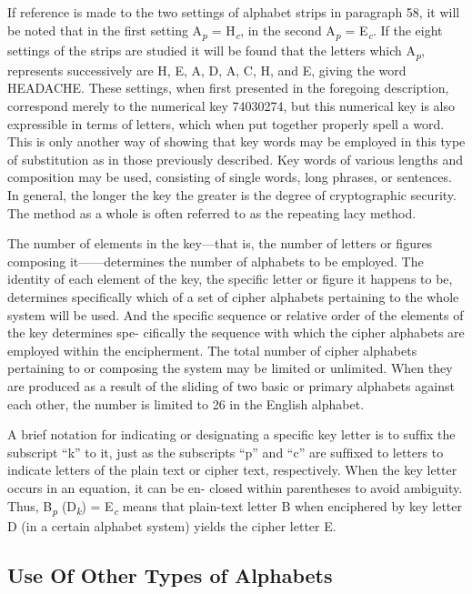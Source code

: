 \mypara If reference is made to the two settings of alphabet strips in paragraph 58, it will be noted that in the ﬁrst setting A\textsubscript{\textit{p}} = H\textsubscript{\textit{c}}, in the second
A\textsubscript{\textit{p}} = E\textsubscript{\textit{c}}. If the eight settings of the strips are studied it will be found
that the letters which A\textsubscript{\textit{p}}, represents successively are H, E, A, D, A, C,
H, and E, giving the word HEADACHE. These settings, when ﬁrst
presented in the foregoing description, correspond merely to the numerical key 74030274, but this numerical key is also expressible in terms of
letters, which when put together properly spell a word. This is only
another way of showing that key words may be employed in this type of
substitution as in those previously described. Key words of various
lengths and composition may be used, consisting of single words, long
phrases, or sentences. In general, the longer the key the greater is the
degree of cryptographic security. The method as a whole is often
referred to as the repeating lacy method.

\mypara The number of elements in the key—that is, the number of letters
or ﬁgures composing it——determines the number of alphabets to be employed. The identity of each element of the key, the speciﬁc letter or
ﬁgure it happens to be, determines speciﬁcally which of a set of cipher
alphabets pertaining to the whole system will be used. And the speciﬁc
sequence or relative order of the elements of the key determines spe-
ciﬁcally the sequence with which the cipher alphabets are employed within the encipherment. The total number of cipher alphabets pertaining to
or composing the system may be limited or unlimited. When they are
produced as a result of the sliding of two basic or primary alphabets
against each other, the number is limited to 26 in the English alphabet.

\mypara A brief notation for indicating or designating a speciﬁc key letter
is to sufﬁx the subscript “k” to it, just as the subscripts “p” and “c”
are sufﬁxed to letters to indicate letters of the plain text or cipher text,
respectively. When the key letter occurs in an equation, it can be en-
closed within parentheses to avoid ambiguity. Thus, B\textsubscript{\textit{p}} (D\textsubscript{\textit{k}}) = E\textsubscript{\textit{c}}
means that plain-text letter B when enciphered by key letter D (in a
certain alphabet system) yields the cipher letter E.

\subsection{Use Of Other Types of Alphabets}

